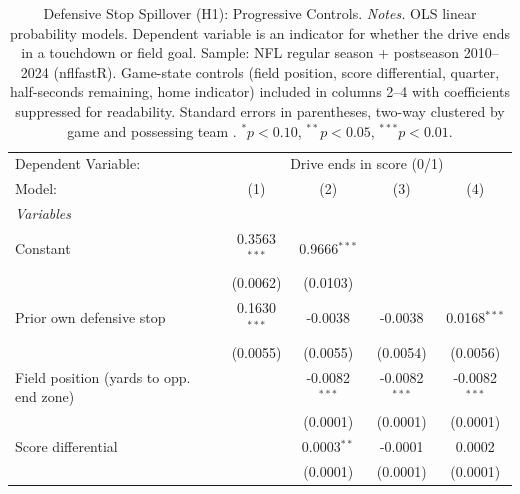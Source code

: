 
\begin{table}[htbp]
   \caption{\label{tab:h1prog} Defensive Stop Spillover (H1): Progressive Controls. \textit{Notes.} OLS linear probability models. Dependent variable is an indicator for whether the drive ends in a touchdown or field goal. Sample: NFL regular season + postseason 2010--2024 (nflfastR). Game-state controls (field position, score differential, quarter, half-seconds remaining, home indicator) included in columns 2--4 with coefficients suppressed for readability. Standard errors in parentheses, two-way clustered by game and possessing team \citep{cameron2011robust}. $^{*}p<0.10$, $^{**}p<0.05$, $^{***}p<0.01$.}
   \centering
   \begin{tabular}{lcccc}
      \tabularnewline \midrule \midrule
      Dependent Variable: & \multicolumn{4}{c}{Drive ends in score (0/1)}\\
      Model:                                  & (1)            & (2)                           & (3)                           & (4)\\  
      \midrule
      \emph{Variables}\\
      Constant                                & 0.3563$^{***}$ & 0.9666$^{***}$                &                               &   \\   
                                              & (0.0062)       & (0.0103)                      &                               &   \\   
      Prior own defensive stop                & 0.1630$^{***}$ & -0.0038                       & -0.0038                       & 0.0168$^{***}$\\   
                                              & (0.0055)       & (0.0055)                      & (0.0054)                      & (0.0056)\\   
      Field position (yards to opp. end zone) &                & -0.0082$^{***}$               & -0.0082$^{***}$               & -0.0082$^{***}$\\   
                                              &                & (0.0001)                      & (0.0001)                      & (0.0001)\\   
      Score differential                      &                & 0.0003$^{**}$                 & -0.0001                       & 0.0002\\   
                                              &                & (0.0001)                      & (0.0001)                      & (0.0001)\\   

\end{tabular}
\end{table}
